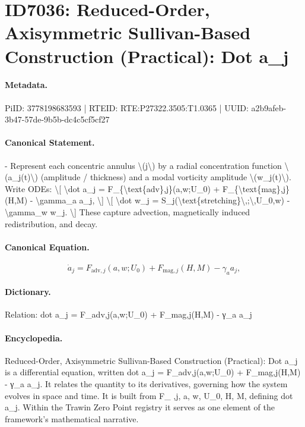 \section*{ID7036: Reduced-Order, Axisymmetric Sullivan-Based Construction (Practical): Dot a\_j}
\paragraph{Metadata.}
PiID: 3778198683593 | RTEID: RTE:P27322.3505:T1.0365 | UUID: a2b9afeb-3b47-57de-9b5b-dc4c5cf5cf27

\paragraph{Canonical Statement.}
- Represent each concentric annulus \textbackslash{}(j\textbackslash{}) by a radial concentration function \textbackslash{}(a\_j(t)\textbackslash{}) (amplitude / thickness) and a modal vorticity amplitude \textbackslash{}(w\_j(t)\textbackslash{}). Write ODEs: \textbackslash{}[ \textbackslash{}dot a\_j = F\_\{\textbackslash{}text\{adv\},j\}(a,w;U\_0) + F\_\{\textbackslash{}text\{mag\},j\}(H,M) - \textbackslash{}gamma\_a a\_j, \textbackslash{}] \textbackslash{}[ \textbackslash{}dot w\_j = S\_j(\textbackslash{}text\{stretching\}\textbackslash{},;\textbackslash{},U\_0,w) - \textbackslash{}gamma\_w w\_j. \textbackslash{}] These capture advection, magnetically induced redistribution, and decay.

\paragraph{Canonical Equation.}
\[
\dot a_j = F_{\text{adv},j}(a,w;U_0) + F_{\text{mag},j}(H,M) - \gamma_a a_j,
\]

\paragraph{Dictionary.}
Relation: dot a\_j = F\_adv,j(a,w;U\_0) + F\_mag,j(H,M) - γ\_a a\_j

\paragraph{Encyclopedia.}
Reduced-Order, Axisymmetric Sullivan-Based Construction (Practical): Dot a\_j is a differential equation, written dot a\_j = F\_adv,j(a,w;U\_0) + F\_mag,j(H,M) - γ\_a a\_j. It relates the quantity to its derivatives, governing how the system evolves in space and time. It is built from F\_ ,j, a, w, U\_0, H, M, defining dot a\_j. Within the Trawin Zero Point registry it serves as one element of the framework's mathematical narrative.
